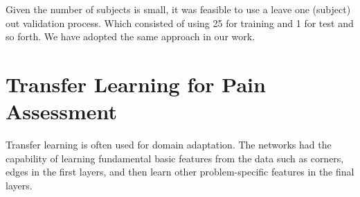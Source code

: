 Given the number of subjects is small, it was feasible to use a leave one (subject) out validation process. Which consisted of using 25 for training and 1 for test and so forth. We have adopted the same approach in our work.

\section{Transfer Learning for Pain Assessment}

Transfer learning is often used for domain adaptation. The networks had the capability of learning fundamental basic features from the data such as corners, edges in the first layers, and then learn other problem-specific features in the final layers. 

